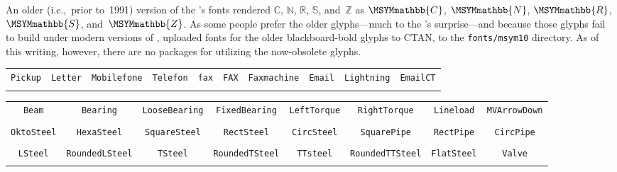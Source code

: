 \begin{center}
\ifx\MSYMmathbb\undefined\else
\bigskip
\begin{tablenote}[\S]
  An older (i.e.,~prior to~1991) version of the \AMS's fonts rendered
  $\mathbb{C}$, $\mathbb{N}$, $\mathbb{R}$, $\mathbb{S}$,
  and~$\mathbb{Z}$ as $\MSYMmathbb{C}$, $\MSYMmathbb{N}$,
  $\MSYMmathbb{R}$, $\MSYMmathbb{S}$, and~$\MSYMmathbb{Z}$.  As some
  people prefer the older glyphs---much to the \AMS's surprise---and
  because those glyphs fail to build under modern versions of
  \metafont,  uploaded \postscript fonts for
  the older blackboard-bold glyphs to CTAN\idxCTAN{}, to the
  \texttt{fonts/msym10} directory.  As of this writing, however, there
  are no \latexE packages for utilizing the now-obsolete glyphs.
\end{tablenote}
\fi
\end{center}




\bgroup
\renewcommand\arraystretch{1.4}
\newcommand\leg[1]{{\tiny\tt\char92#1}}
\newcommand\sho[1]{{\large #1}}
\begin{tabular}{|*{10}{c}|} \hline
\leg{Pickup} &
\leg{Letter} & 
\leg{Mobilefone} &
\leg{Telefon} &
\leg{fax} &
\leg{FAX} &
\leg{Faxmachine} &
\leg{Email} &
\leg{Lightning} &
\leg{EmailCT} \\
\sho{\Pickup} &
\sho{\Letter} &
\sho{\Mobilefone} &
\sho{\Telefon} &
\sho{\fax} &
\sho{\FAX} &
\sho{\Faxmachine} &
\sho{\Email} &
\sho{\Lightning} &
\sho{\EmailCT} \\
\hline
\end{tabular}

\begin{tabular}{|*{8}{c}|} \hline
\leg{Beam} &
\leg{Bearing} &
\leg{LooseBearing} &
\leg{FixedBearing} &
\leg{LeftTorque} &
\leg{RightTorque} &
\leg{Lineload} &
\leg{MVArrowDown} \\
\sho{\Beam} &
\sho{\Bearing} &
\sho{\LooseBearing} &
\sho{\FixedBearing} &
\sho{\LeftTorque} &
\sho{\RightTorque} &
\sho{\Lineload} &
\sho{\MVArrowDown} \\
\hline
\leg{OktoSteel} &
\leg{HexaSteel} &
\leg{SquareSteel} & 
\leg{RectSteel} &
\leg{CircSteel} &
\leg{SquarePipe} &
\leg{RectPipe} &
\leg{CircPipe}
\\
\sho{\OktoSteel} &
\sho{\HexaSteel} &
\sho{\SquareSteel} &
\sho{\RectSteel} &
\sho{\CircSteel} &
\sho{\SquarePipe} &
\sho{\RectPipe} &
\sho{\CircPipe}
\\ \hline
\leg{LSteel} &
\leg{RoundedLSteel} &
\leg{TSteel} &
\leg{RoundedTSteel} &
\leg{TTsteel} &
\leg{RoundedTTSteel} &
\leg{FlatSteel} &
\leg{Valve}
\\
\sho{\LSteel} &
\sho{\RoundedLSteel} &
\sho{\TSteel} &
\sho{\RoundedTSteel} &
\sho{\TTSteel} &
\sho{\RoundedTTSteel} &
\sho{\FlatSteel} &
\sho{\Valve}
\\ \hline
\end{tabular}

